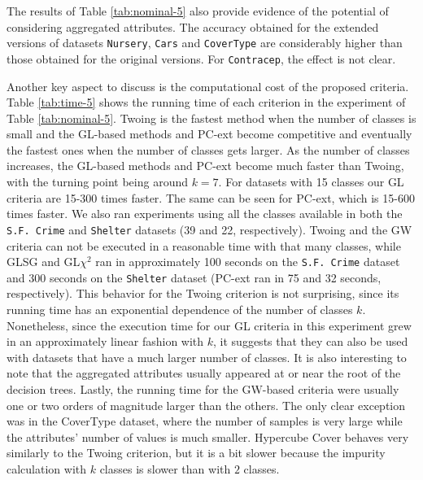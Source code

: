 \begin{sidewaystable*}[ph!]
\begin{tabular}{c|cc|cc|cc|cc|cc|cc|cc|cc}
\end{tabular}
\caption{Average accuracy and statistical tests  for  decision trees with depth at most 5 using only nominal attributes. The best accuracy for each dataset is bold-faced. Experiments that did not finish in reasonable time are considered statistically worse than the others. These criteria have a * mark besides their average accuracies, since they are calculated only on the experiments that finished.}
\label{tab:nominal-5}
\normalsize
\end{sidewaystable*}


The results of  Table \ref{tab:nominal-5} also provide evidence of  the potential of considering aggregated attributes. The accuracy obtained for the extended versions of datasets
{\tt Nursery}, {\tt Cars} and {\tt CoverType} are considerably higher than those obtained for the original versions. For {\tt Contracep}, the effect is not clear.

Another key aspect to discuss is the computational cost of the proposed criteria. Table \ref{tab:time-5} shows the running time of each criterion in the experiment of Table \ref{tab:nominal-5}. Twoing is the fastest method when the number of classes is small and the GL-based methods  and PC-ext become competitive and eventually the fastest ones when the number of classes gets larger. As the number of classes increases, the GL-based methods and PC-ext become much faster than Twoing, with the turning point being around $k=7$. For datasets with 15 classes our GL criteria are 15-300 times faster. The same can be seen for PC-ext, which is 15-600 times faster. We also ran experiments using all the classes available in both the {\tt S.F. Crime} and {\tt Shelter} datasets (39 and 22, respectively). Twoing and the GW criteria can not be executed in a reasonable time with that many classes, while GLSG and GL$\chi^2$ ran in approximately 100 seconds on the {\tt S.F. Crime} dataset and  300 seconds on the {\tt Shelter} dataset (PC-ext ran in 75 and 32 seconds, respectively). This behavior for the Twoing criterion is not surprising, since its running time has an exponential dependence of the number of classes $k$. Nonetheless, since the execution time for our GL criteria in this experiment grew in an approximately linear fashion with $k$, it suggests that they can also be used with datasets that have a much larger number of classes. It is also interesting to note that the aggregated attributes usually appeared at or near the root of the decision trees. Lastly, the running time for the GW-based criteria were usually one or two orders of magnitude larger than the others. The only clear exception was in the CoverType dataset, where the number of samples is very large while the attributes’ number of values is much smaller. Hypercube Cover behaves very similarly to the Twoing criterion, but it is a bit slower because the impurity calculation with $k$ classes is slower than with $2$ classes.

